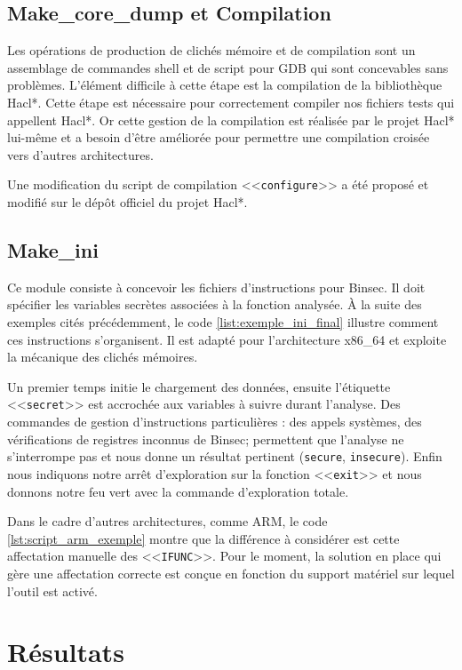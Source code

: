 \subsection*{Make\_core\_dump et Compilation}

Les opérations de production de clichés mémoire et de compilation sont un assemblage de commandes shell et de script pour GDB qui sont concevables sans problèmes. L'élément difficile à cette étape est la compilation de la bibliothèque Hacl*. Cette étape est nécessaire pour correctement compiler nos fichiers tests qui appellent Hacl*. Or cette gestion de la compilation est réalisée par le projet Hacl* lui-même et a besoin d'être améliorée pour permettre une compilation croisée vers d'autres architectures.\smallbreak

Une modification du script de compilation <<\texttt{configure}>> a été proposé et modifié sur le dépôt officiel du projet Hacl*.

\subsection*{Make\_ini}

Ce module consiste à concevoir les fichiers d'instructions pour Binsec. Il doit spécifier les variables secrètes associées à la fonction analysée. À la suite des exemples cités précédemment, le code \ref{list:exemple_ini_final} illustre comment ces instructions s'organisent. Il est adapté pour l'architecture x86\_64 et exploite la mécanique des clichés mémoires.\smallbreak

Un premier temps initie le chargement des données, ensuite l'étiquette <<\texttt{secret}>> est accrochée aux variables à suivre durant l'analyse. Des commandes de gestion d'instructions particulières : des appels systèmes, des vérifications de registres inconnus de Binsec; permettent que l'analyse ne s'interrompe pas et nous donne un résultat pertinent (\texttt{secure}, \texttt{insecure}). Enfin nous indiquons notre arrêt d'exploration sur la fonction <<\texttt{exit}>> et nous donnons notre feu vert avec la commande d'exploration totale.\medbreak

Dans le cadre d'autres architectures, comme ARM, le code \ref{lst:script_arm_exemple} montre que la différence à considérer est cette affectation manuelle des <<\texttt{IFUNC}>>. Pour le moment, la solution en place qui gère une affectation correcte est conçue en fonction du support matériel sur lequel l'outil est activé.

\section{Résultats}


